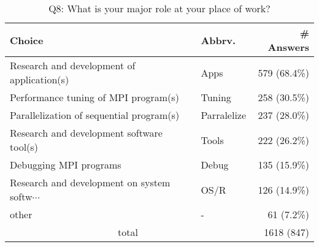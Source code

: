 \begin{table}[htb]%
\begin{center}%
\caption{Q8: What is your major role at your place of work?}%
\label{tab:Q8-ans}%
\begin{tabular}{l|l|r}%
\hline%
Choice & Abbrv. & \# Answers \\%
\hline%
{\small Research and development of application(s)} & Apps & 579 (68.4\%) \\%
Performance tuning of MPI program(s) & Tuning & 258 (30.5\%) \\%
Parallelization of sequential program(s) & Parralelize & 237 (28.0\%) \\%
{\small Research and development software tool(s)} & Tools & 222 (26.2\%) \\%
Debugging MPI programs & Debug & 135 (15.9\%) \\%
{\small Research and development on system softw$\cdots$} & OS/R & 126 (14.9\%) \\%
other & - & 61 (7.2\%) \\%
\hline%
\multicolumn{2}{c}{total} & 1618 (847)\\%
\hline%
\end{tabular}%
\end{center}%
\end{table}%
